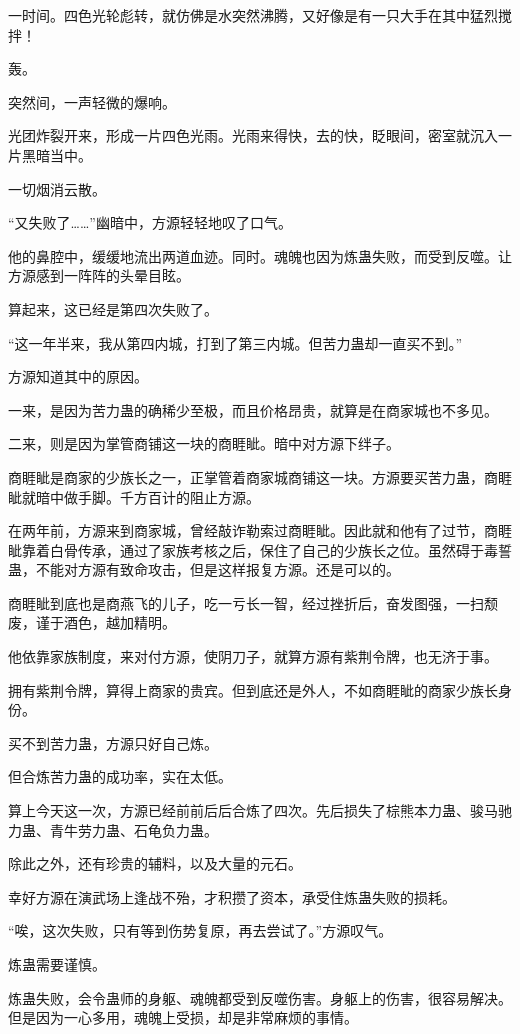 \begin{this_body}
一时间。四色光轮彪转，就仿佛是水突然沸腾，又好像是有一只大手在其中猛烈搅拌！

轰。

突然间，一声轻微的爆响。

光团炸裂开来，形成一片四色光雨。光雨来得快，去的快，眨眼间，密室就沉入一片黑暗当中。

一切烟消云散。

“又失败了……”幽暗中，方源轻轻地叹了口气。

他的鼻腔中，缓缓地流出两道血迹。同时。魂魄也因为炼蛊失败，而受到反噬。让方源感到一阵阵的头晕目眩。

算起来，这已经是第四次失败了。

“这一年半来，我从第四内城，打到了第三内城。但苦力蛊却一直买不到。”

方源知道其中的原因。

一来，是因为苦力蛊的确稀少至极，而且价格昂贵，就算是在商家城也不多见。

二来，则是因为掌管商铺这一块的商睚眦。暗中对方源下绊子。

商睚眦是商家的少族长之一，正掌管着商家城商铺这一块。方源要买苦力蛊，商睚眦就暗中做手脚。千方百计的阻止方源。

在两年前，方源来到商家城，曾经敲诈勒索过商睚眦。因此就和他有了过节，商睚眦靠着白骨传承，通过了家族考核之后，保住了自己的少族长之位。虽然碍于毒誓蛊，不能对方源有致命攻击，但是这样报复方源。还是可以的。

商睚眦到底也是商燕飞的儿子，吃一亏长一智，经过挫折后，奋发图强，一扫颓废，谨于酒色，越加精明。

他依靠家族制度，来对付方源，使阴刀子，就算方源有紫荆令牌，也无济于事。

拥有紫荆令牌，算得上商家的贵宾。但到底还是外人，不如商睚眦的商家少族长身份。

买不到苦力蛊，方源只好自己炼。

但合炼苦力蛊的成功率，实在太低。

算上今天这一次，方源已经前前后后合炼了四次。先后损失了棕熊本力蛊、骏马驰力蛊、青牛劳力蛊、石龟负力蛊。

除此之外，还有珍贵的辅料，以及大量的元石。

幸好方源在演武场上逢战不殆，才积攒了资本，承受住炼蛊失败的损耗。

“唉，这次失败，只有等到伤势复原，再去尝试了。”方源叹气。

炼蛊需要谨慎。

炼蛊失败，会令蛊师的身躯、魂魄都受到反噬伤害。身躯上的伤害，很容易解决。但是因为一心多用，魂魄上受损，却是非常麻烦的事情。


\end{this_body}
